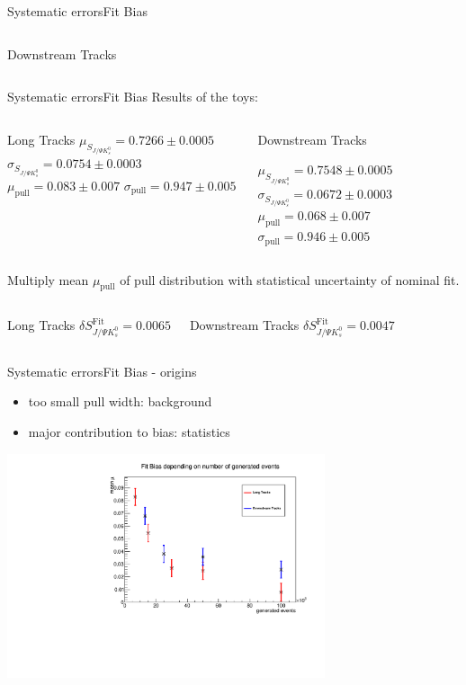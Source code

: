 \documentclass{beamer}
\newcommand{\SJPsi}{S_{J/\Psi K_s^0}}
\begin{document}
\begin{frame}{Systematic errors}{Fit Bias}
\begin{columns}
\begin{block}{Downstream Tracks}
	\end{block}
	\end{columns}
	\end{frame}
	
	\begin{frame}{Systematic errors}{Fit Bias}
	Results of the toys:
	\begin{columns}
	\begin{block}{Long Tracks}
        $\mu_{\SJPsi} = 0.7266 \pm 0.0005$
        $\sigma_{\SJPsi} = 0.0754 \pm 0.0003$
        $\mu_{\text{pull}} = 0.083 \pm 0.007$
        $\sigma_{\text{pull}} = 0.947 \pm 0.005$
    \end{block}
	\begin{block}{Downstream Tracks}
    
        $\mu_{\SJPsi} = 0.7548 \pm 0.0005$
        $\sigma_{\SJPsi} = 0.0672 \pm 0.0003$
        $\mu_{\text{pull}} = 0.068 \pm 0.007$
        $\sigma_{\text{pull}} = 0.946 \pm 0.005$
    \end{block}
    \end{columns}
	\vspace{0.5cm} 
	Multiply mean $\mu_{\text{pull}}$ of pull distribution with statistical uncertainty of nominal fit.
	\begin{columns}
	\begin{block}{Long Tracks}
    \centering
        $\delta\SJPsi^{\text{Fit}} = 0.0065$
    \end{block}
	\begin{block}{Downstream Tracks}
    \centering
        $\delta\SJPsi^{\text{Fit}} = 0.0047$
    \end{block}
    \end{columns}
    \end{frame}
	
	\begin{frame}{Systematic errors}{Fit Bias - origins}
    \begin{itemize}
    \item too small pull width: background
    \item major contribution to bias: statistics
    \end{itemize}
    \begin{center}
    \includegraphics[width = 0.7\textwidth]{fit_bias_statistics}
    \end{center}
    \end{frame}
	
\end{document}
